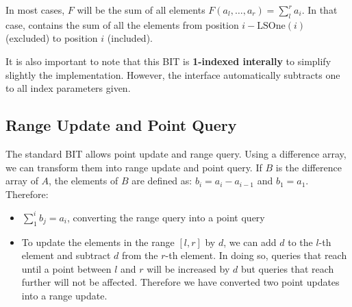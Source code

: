 In most cases, $F$ will be the sum of all elements $F(a_l,\dots, a_r)=\sum_l^r{a_i}$.
In that case,  contains the sum of all the elements from 
position $i-\text{LSOne}(i)$ (excluded) to position $i$ (included).


It is also important to note that this BIT is \textbf{1-indexed interally} to simplify slightly 
the implementation. However, the interface automatically subtracts one to all index parameters
given.
\subsection*{Range Update and Point Query}
The standard BIT allows point update and range query. Using a difference array, we can 
transform them into range update and point query. If $B$ is the difference array
of $A$, the elements of $B$ are defined as:  $b_i=a_i- a_{i-1}$ and $b_1=a_1$.
Therefore:
\begin{itemize}
		\setlength{\itemsep}{2pt}
		\item $\sum_{1}^i b_j=a_i$, converting the range query into 
				a point query
		\item To update the elements in the range $[l,r]$ by $d$, we can add
				$d$ to the $l$-th element and subtract $d$ from the $r$-th element.
				In doing so, queries that reach until a point
				between $l$ and $r$ will be increased by $d$ but queries that reach 
				further will not be affected.
				Therefore we have converted two point updates into a range update.

\end{itemize}


